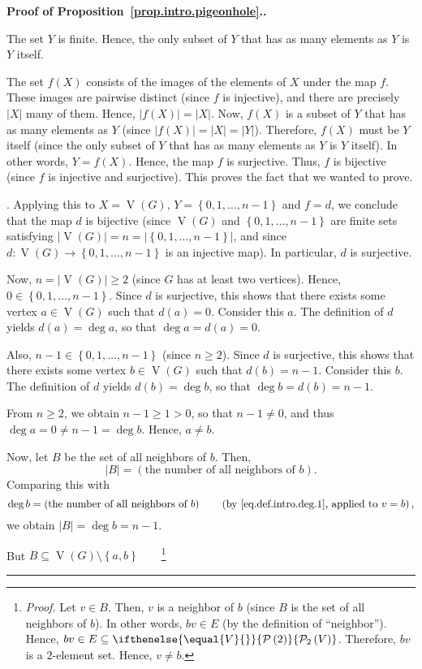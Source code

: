 \documentclass[numbers=enddot,12pt,final,onecolumn,notitlepage]{scrartcl}%
\theoremstyle{definition}
\newenvironment{proof}[1][Proof]{\noindent\textbf{#1.} }{\ \rule{0.5em}{0.5em}}
\newcommand{\powset}[2][]{\ifthenelse{\equal{#2}{}}{\mathcal{P}\left(#1\right)}{\mathcal{P}_{#1}\left(#2\right)}}
\newcommand{\set}[1]{\left\{ #1 \right\}}
\newcommand{\abs}[1]{\left| #1 \right|}
\newcommand{\tup}[1]{\left( #1 \right)}
\newcommand{\verts}[1]{\operatorname{V}\left( #1 \right)}
\begin{document}
\begin{proof}[Proof of Proposition~\ref{prop.intro.pigeonhole}.]
{The set $Y$ is finite. Hence, the only subset of $Y$ that has as
many elements as $Y$ is $Y$ itself.

The set $f\tup{X}$ consists of the images of the elements of $X$ under
the map $f$. These images are pairwise distinct (since $f$ is
injective), and there are precisely $\abs{X}$ many of them.
Hence, $\abs{f\tup{X}} = \abs{X}$. Now, $f\tup{X}$ is a subset of $Y$
that has as many elements as $Y$ (since $\abs{f\tup{X}} = \abs{X}
= \abs{Y}$). Therefore, $f\tup{X}$ must be $Y$ itself (since the only
subset of $Y$ that has as many elements as $Y$ is $Y$ itself). In
other words, $Y = f\tup{X}$. Hence, the map $f$ is surjective. Thus,
$f$ is bijective (since $f$ is injective and surjective). This proves
the fact that we wanted to prove.}. Applying this to $X = \verts{G}$,
$Y = \set{0, 1, \ldots, n-1}$ and $f = d$, we conclude that
the map $d$ is bijective (since $\verts{G}$ and
$\set{0, 1, \ldots, n-1}$ are finite sets satisfying
$\abs{\verts{G}} = n = \abs{\set{0, 1, \ldots, n-1}}$, and since
$d : \verts{G} \to \set{0, 1, \ldots, n-1}$ is an injective map).
In particular, $d$ is surjective.

Now, $n = \abs{\verts{G}} \geq 2$ (since $G$ has at least two
vertices). Hence, $0 \in \set{0, 1, \ldots, n-1}$. Since $d$ is
surjective, this shows that there exists some vertex $a \in \verts{G}$
such that $d\tup{a} = 0$. Consider this $a$. The definition of $d$
yields $d\tup{a} = \deg a$, so that $\deg a = d\tup{a} = 0$.

Also, $n-1 \in \set{0, 1, \ldots, n-1}$ (since $n \geq 2$). Since $d$
is surjective, this shows that there exists some vertex
$b \in \verts{G}$
such that $d\tup{b} = n-1$. Consider this $b$. The definition of $d$
yields $d\tup{b} = \deg b$, so that $\deg b = d\tup{b} = n-1$.

From $n \geq 2$, we obtain $n-1 \geq 1 > 0$, so that $n-1 \neq 0$,
and thus $\deg a = 0 \neq n-1 = \deg b$. Hence, $a \neq b$.

Now, let $B$ be the set of all neighbors of $b$. Then,
\[
\abs{B} = \left(\text{the number of all neighbors of } b\right) .
\]
Comparing this with
\[
\deg b = \left(\text{the number of all neighbors of } b\right)
\qquad \left(\text{by \eqref{eq.def.intro.deg.1}, applied to } v = b
\right) ,
\]
we obtain $\abs{B} = \deg b = n-1$.

But $B \subseteq
\verts{G} \setminus \set{a, b}$\ \ \ \ \footnote{\textit{Proof.}
Let $v \in B$. Then, $v$ is a neighbor of $b$ (since $B$ is the set of
all neighbors of $b$). In other words, $bv \in E$ (by the definition
of ``neighbor''). Hence, $bv \in E \subseteq \powset[2]{V}$.
Therefore, $bv$ is a $2$-element set. Hence, $v \neq b$.

}
\end{proof}
\end{document}
